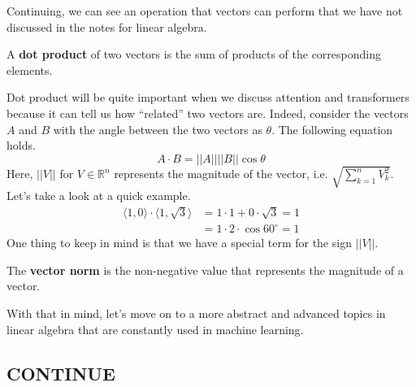 \documentclass[../../main.tex]{subfiles}
\begin{document}
\begin{figure}[H]
\centering
{}
\end{figure}

Continuing, we can see an operation that vectors can perform that
we have not discussed in the notes for linear algebra.

\begin{definition}{}{}
A \textbf{dot product} of two vectors is the sum of products of the
corresponding elements.
\end{definition}

Dot product will be quite important when we discuss attention and
transformers because it can tell us how ``related'' two vectors are.
Indeed, consider the vectors $A$ and $B$ with the angle between the
two vectors as $\theta$. The following equation holds.
\[
A \cdot B = ||A|| ||B|| \cos\theta
\]
Here, $||V||$ for $V \in \mathbb{R}^n$ represents the magnitude of the
vector, i.e. $\sqrt{\sum_{k=1}^n V_k^2}$. Let's take a look at a quick
example.
\begin{align*}
    \langle 1, 0 \rangle \cdot \langle 1, \sqrt{3} \rangle
    &= 1 \cdot 1 + 0 \cdot \sqrt{3} = 1 \\
    &= 1 \cdot 2 \cdot \cos60^\circ = 1
\end{align*}
One thing to keep in mind is that we have a special term for the
sign $||V||$.

\begin{definition}{}{}
The \textbf{vector norm} is the non-negative value that represents
the magnitude of a vector.
\end{definition}

With that in mind, let's move on to a more abstract and advanced
topics in linear algebra that are constantly used in machine learning.

\subsection{CONTINUE}
\end{document}
